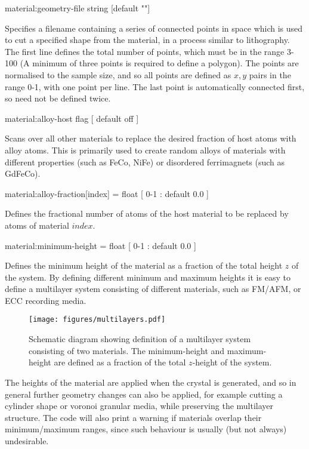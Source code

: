 {\zicf material:geometry-file string [default ""]} Specifies a filename containing a series of connected points in space which is used to cut a specified shape from the material, in a process similar to lithography. The first line defines the total number of points, which must be in the range 3-100 (A minimum of three points is required to define a polygon). The points are normalised to the sample size, and so all points are defined as $x,y$ pairs in the range 0-1, with one point per line. The last point is automatically connected first, so need not be defined twice.

{\zicf material:alloy-host flag [ default off ]} Scans over all other materials to replace the desired fraction of host atoms with alloy atoms. This is primarily used to create random alloys of materials with different properties (such as FeCo, NiFe) or disordered ferrimagnets (such as GdFeCo).


{\zicf material:alloy-fraction[index] = float [ 0-1 : default 0.0 ]} Defines the fractional number of atoms of the host material to be replaced by atoms of material $index$.

{\zicf material:minimum-height = float [ 0-1 : default 0.0 ]} Defines the minimum height of the material as a fraction of the total height $z$ of the system. By defining different minimum and maximum heights it is easy to define a multilayer system consisting of different materials, such as FM/AFM, or ECC recording media.

\begin{figure*}[!h]
\center
\texttt{[image: figures/multilayers.pdf]}
\caption{Schematic diagram showing definition of a multilayer system consisting of two materials. The minimum-height and maximum-height are defined as a fraction of the total $z$-height of the system.}
\label{fig:multilayer}
\end{figure*}

The heights of the material are applied when the crystal is generated, and so in general further geometry changes can also be applied, for example cutting a cylinder shape or voronoi granular media, while preserving the multilayer structure. The code will also print a warning if materials overlap their minimum/maximum ranges, since such behaviour is usually (but not always) undesirable.

